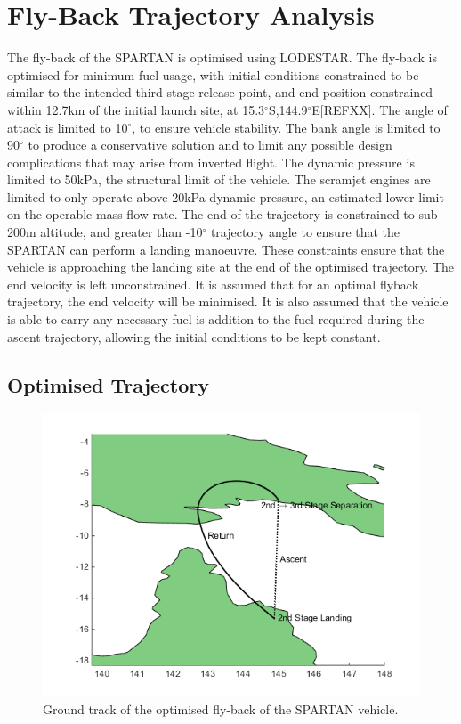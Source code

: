 \documentclass[conf]{new-aiaa}
\begin{document}
\section{Fly-Back Trajectory Analysis}
The fly-back of the SPARTAN is optimised using LODESTAR. The fly-back is optimised for minimum fuel usage, with initial conditions constrained to be similar to the intended third stage release point, and end position constrained within 12.7km of the initial launch site, at  15.3$^\circ$S,144.9$^\circ$E[REFXX]. The angle of attack is limited to 10$^\circ$, to ensure vehicle stability. The bank angle is limited to 90$^\circ$ to produce a conservative solution and to limit any possible design complications that may arise from inverted flight. The dynamic pressure is limited to 50kPa, the structural limit of the vehicle. The scramjet engines are limited to only operate above 20kPa dynamic pressure, an estimated lower limit on the operable mass flow rate.
The end of the trajectory is constrained to sub-200m altitude, and greater than -10$^\circ$ trajectory angle to ensure that the SPARTAN can perform a landing manoeuvre. These constraints ensure that the vehicle is approaching the landing site at the end of the optimised trajectory. The end velocity is left unconstrained. It is assumed that for an optimal flyback trajectory, the end velocity will be minimised. 
It is also assumed that the vehicle is able to carry any necessary fuel is addition to the fuel required during the ascent trajectory, allowing the initial conditions to be kept constant. 

\subsection{Optimised Trajectory}
\begin{figure}[ht]
	\centering
	\includegraphics[width=0.6\linewidth]{Figures/lon-lat}
	\caption{Ground track of the optimised fly-back of the SPARTAN vehicle.}
	\label{fig:lon-lat}
\end{figure}  
\end{document}
